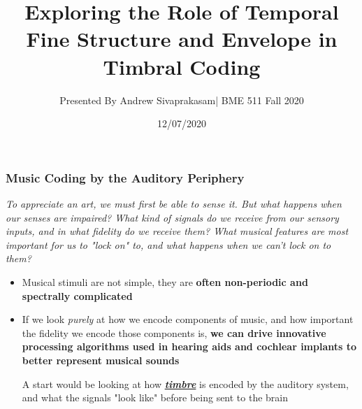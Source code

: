 \documentclass[aspectratio=1610]{beamer}
\title{Exploring the Role of Temporal Fine Structure and Envelope in Timbral Coding}
\author{Presented By Andrew Sivaprakasam| BME 511 Fall 2020}
\date{12/07/2020}
\begin{document}
\frame{\titlepage}

\begin{frame}
\frametitle{Music Coding by the Auditory Periphery}

\textit{To appreciate an art, we must first be able to sense it. But what happens when our senses are impaired? What kind of signals do we receive from our sensory inputs, and in what fidelity do we receive them? What musical features are most important for us to "lock on" to, and what happens when we can't lock on to them?}\vspace{.5em}

\begin{itemize}[label = $\blacktriangleright$]
\item Musical stimuli are not simple, they are \textbf{often non-periodic and spectrally complicated}
\item If we look \textit{purely} at how we encode components of music, and how important the fidelity we encode those components is, \textbf{we can drive innovative processing algorithms used in hearing aids and cochlear implants to better represent musical sounds}\vspace{1em}

A start would be looking at how \textbf{\textit{\underline{timbre}}} is encoded by the auditory system, and what the signals "look like" before being sent to the brain

\end{itemize}
\end{frame}
\end{document}
